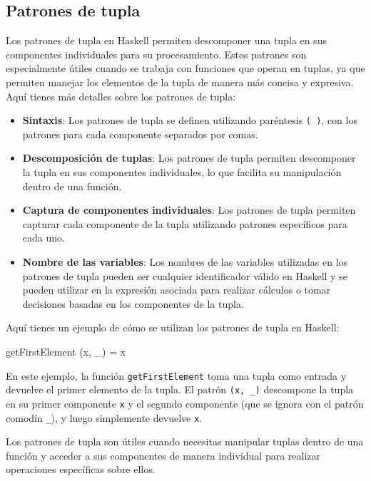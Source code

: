 \documentclass{article}
\begin{document}
\subsection{Patrones de tupla}

Los patrones de tupla en Haskell permiten descomponer una tupla en sus componentes individuales para su procesamiento. Estos patrones son especialmente útiles cuando se trabaja con funciones que operan en tuplas, ya que permiten manejar los elementos de la tupla de manera más concisa y expresiva. Aquí tienes más detalles sobre los patrones de tupla:

\begin{itemize}
    \item \textbf{Sintaxis}: Los patrones de tupla se definen utilizando paréntesis \texttt{( )}, con los patrones para cada componente separados por comas.
  
    \item \textbf{Descomposición de tuplas}: Los patrones de tupla permiten descomponer la tupla en sus componentes individuales, lo que facilita su manipulación dentro de una función.
  
    \item \textbf{Captura de componentes individuales}: Los patrones de tupla permiten capturar cada componente de la tupla utilizando patrones específicos para cada uno.
  
    \item \textbf{Nombre de las variables}: Los nombres de las variables utilizadas en los patrones de tupla pueden ser cualquier identificador válido en Haskell y se pueden utilizar en la expresión asociada para realizar cálculos o tomar decisiones basadas en los componentes de la tupla.
\end{itemize}

Aquí tienes un ejemplo de cómo se utilizan los patrones de tupla en Haskell:

\begin{haskell}
getFirstElement (x, _) = x
\end{haskell}

En este ejemplo, la función \texttt{getFirstElement} toma una tupla como entrada y devuelve el primer elemento de la tupla. El patrón \texttt{(x, \_)} descompone la tupla en su primer componente \texttt{x} y el segundo componente (que se ignora con el patrón comodín \texttt{\_}), y luego simplemente devuelve \texttt{x}.

Los patrones de tupla son útiles cuando necesitas manipular tuplas dentro de una función y acceder a sus componentes de manera individual para realizar operaciones específicas sobre ellos.
\end{document}
